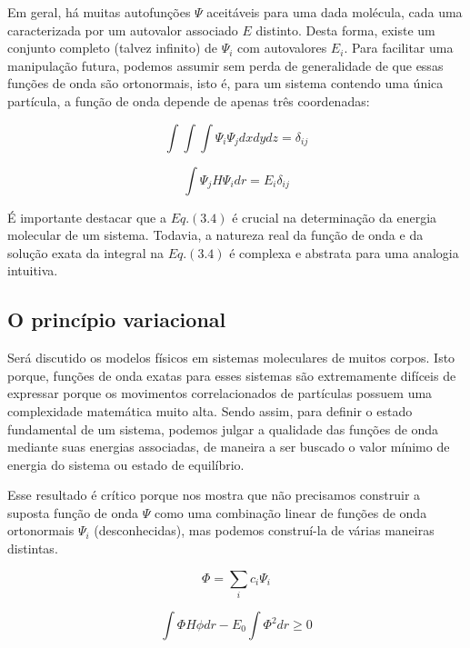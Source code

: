 Em geral, há muitas autofunções $\Psi$ aceitáveis para uma dada molécula, cada uma
caracterizada por um autovalor associado $E$ distinto. Desta forma, existe um conjunto completo (talvez infinito) de $\Psi_i$ com autovalores $E_i$. Para facilitar uma manipulação futura, podemos assumir sem perda de generalidade de que essas funções de onda são ortonormais, isto é, para um sistema contendo uma única partícula, a função de onda depende de apenas três coordenadas: \cite{Cramer2004}

\begin{equation}
    \int \int \int \Psi_i \Psi_j dx dy dz = \delta_{ij}
\end{equation}

\begin{equation}
    \int \Psi_j H \Psi_i dr = E_i \delta_{ij}
\end{equation}

É importante destacar que a $Eq.(3.4)$ é crucial na determinação da energia molecular de um sistema. Todavia, a natureza real da função de onda e da solução exata da integral na $Eq.(3.4)$ é complexa e abstrata para uma analogia intuitiva. \cite{Cramer2004}

\subsection{O princípio variacional}

Será discutido os modelos físicos em sistemas moleculares de muitos corpos. Isto porque, funções de onda exatas para esses sistemas são extremamente difíceis de expressar porque os movimentos correlacionados de partículas possuem uma complexidade matemática muito alta. Sendo assim, para definir o estado fundamental de um sistema, podemos julgar a qualidade das funções de onda mediante suas energias associadas, de maneira a ser buscado o valor mínimo de energia do sistema ou estado de equilíbrio. \cite{Cramer2004}

Esse resultado é crítico porque nos mostra que não precisamos construir a suposta função de onda $\Psi$ como uma combinação linear de funções de onda ortonormais $\Psi_i$ (desconhecidas), mas podemos construí-la de várias maneiras distintas. \cite{Cramer2004}

\begin{equation}
    \Phi = \sum_i c_i \Psi_i
\end{equation}

\begin{equation}
    \int \Phi H \phi dr - E_0 \int \Phi^2 dr \geq 0
\end{equation}

